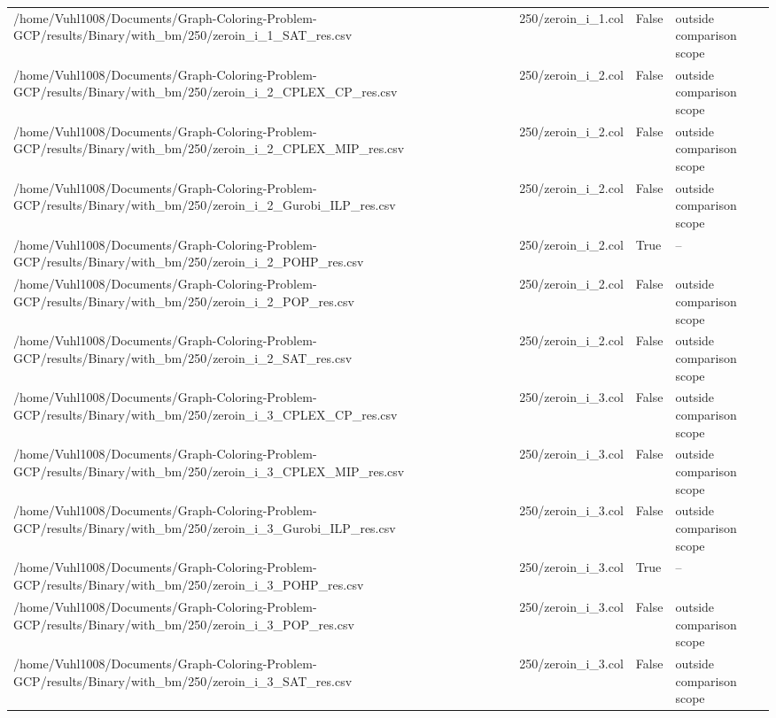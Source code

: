 \begin{table}[htbp]
\begin{tabular}{llll}
/home/Vuhl1008/Documents/Graph-Coloring-Problem-GCP/results/Binary/with\_bm/250/zeroin\_i\_1\_SAT\_res.csv & 250/zeroin\_i\_1.col & False & outside comparison scope \\
/home/Vuhl1008/Documents/Graph-Coloring-Problem-GCP/results/Binary/with\_bm/250/zeroin\_i\_2\_CPLEX\_CP\_res.csv & 250/zeroin\_i\_2.col & False & outside comparison scope \\
/home/Vuhl1008/Documents/Graph-Coloring-Problem-GCP/results/Binary/with\_bm/250/zeroin\_i\_2\_CPLEX\_MIP\_res.csv & 250/zeroin\_i\_2.col & False & outside comparison scope \\
/home/Vuhl1008/Documents/Graph-Coloring-Problem-GCP/results/Binary/with\_bm/250/zeroin\_i\_2\_Gurobi\_ILP\_res.csv & 250/zeroin\_i\_2.col & False & outside comparison scope \\
/home/Vuhl1008/Documents/Graph-Coloring-Problem-GCP/results/Binary/with\_bm/250/zeroin\_i\_2\_POHP\_res.csv & 250/zeroin\_i\_2.col & True & -- \\
/home/Vuhl1008/Documents/Graph-Coloring-Problem-GCP/results/Binary/with\_bm/250/zeroin\_i\_2\_POP\_res.csv & 250/zeroin\_i\_2.col & False & outside comparison scope \\
/home/Vuhl1008/Documents/Graph-Coloring-Problem-GCP/results/Binary/with\_bm/250/zeroin\_i\_2\_SAT\_res.csv & 250/zeroin\_i\_2.col & False & outside comparison scope \\
/home/Vuhl1008/Documents/Graph-Coloring-Problem-GCP/results/Binary/with\_bm/250/zeroin\_i\_3\_CPLEX\_CP\_res.csv & 250/zeroin\_i\_3.col & False & outside comparison scope \\
/home/Vuhl1008/Documents/Graph-Coloring-Problem-GCP/results/Binary/with\_bm/250/zeroin\_i\_3\_CPLEX\_MIP\_res.csv & 250/zeroin\_i\_3.col & False & outside comparison scope \\
/home/Vuhl1008/Documents/Graph-Coloring-Problem-GCP/results/Binary/with\_bm/250/zeroin\_i\_3\_Gurobi\_ILP\_res.csv & 250/zeroin\_i\_3.col & False & outside comparison scope \\
/home/Vuhl1008/Documents/Graph-Coloring-Problem-GCP/results/Binary/with\_bm/250/zeroin\_i\_3\_POHP\_res.csv & 250/zeroin\_i\_3.col & True & -- \\
/home/Vuhl1008/Documents/Graph-Coloring-Problem-GCP/results/Binary/with\_bm/250/zeroin\_i\_3\_POP\_res.csv & 250/zeroin\_i\_3.col & False & outside comparison scope \\
/home/Vuhl1008/Documents/Graph-Coloring-Problem-GCP/results/Binary/with\_bm/250/zeroin\_i\_3\_SAT\_res.csv & 250/zeroin\_i\_3.col & False & outside comparison scope \\

\end{tabular}
\end{table}
